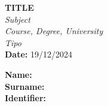 \documentclass[a4paper,4pt]{article}
\begin{document}
\setcounter{page}{1}
\begin{center}
    {\Large \textbf{TITLE}} \\[0.5cm]
    \textit{Subject} \\[0.2cm]
    \textit{Course, Degree, University} \\[0.2cm]
    \textit{Tipo %
    } \\[0.5cm]
    \textbf{Date:} 19/12/2024
\end{center}

\begin{center}
    \textbf{Name:} \underline{\hspace{5cm}} \\
    \textbf{Surname:} \underline{\hspace{5cm}} \\
    \textbf{Identifier:} \underline{\hspace{5cm}} \\
    \vspace{0.5cm}
\end{center}

\begin{enumerate}[label=\textbf{\arabic*:}]
\end{enumerate}
\newpage
\end{document}
